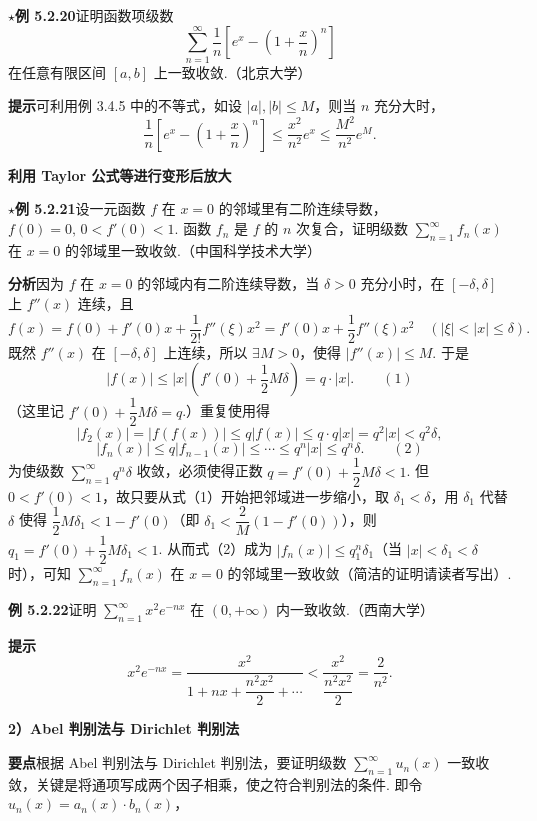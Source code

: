\documentclass[UTF8,12pt,a4paper,fontset=fandol]{ctexart}
\begin{document}
\noindent\textbf{$\star$例 5.2.20}\quad 证明函数项级数
\[
  \sum_{n=1}^{\infty}\frac1n\left[e^x-\left(1+\frac{x}{n}\right)^n\right]
\]
在任意有限区间 $[a,b]$ 上一致收敛.（北京大学）

\noindent\textbf{提示}\quad 可利用例 3.4.5 中的不等式，如设 $|a|,|b|\le M$，则当 $n$ 充分大时，
\[
  \frac1n\left[e^x-\left(1+\frac{x}{n}\right)^n\right]
  \le \frac{x^2}{n^2}e^x\le \frac{M^2}{n^2}e^M.
\]

\noindent\textbf{利用 Taylor 公式等进行变形后放大}

\noindent\textbf{$\star$例 5.2.21}\quad 设一元函数 $f$ 在 $x=0$ 的邻域里有二阶连续导数，
$f(0)=0,\,0<f'(0)<1$. 函数 $f_n$ 是 $f$ 的 $n$ 次复合，证明级数
$\displaystyle\sum_{n=1}^{\infty}f_n(x)$ 在 $x=0$ 的邻域里一致收敛.（中国科学技术大学）

\noindent\textbf{分析}\quad 因为 $f$ 在 $x=0$ 的邻域内有二阶连续导数，当 $\delta>0$ 充分小时，在
$[-\delta,\delta]$ 上 $f''(x)$ 连续，且
\[
  f(x)=f(0)+f'(0)x+\frac1{2!}f''(\xi)x^2
  =f'(0)x+\frac12 f''(\xi)x^2\quad(|\xi|<|x|\le\delta).
\]
既然 $f''(x)$ 在 $[-\delta,\delta]$ 上连续，所以 $\exists M>0$，使得
$|f''(x)|\le M$. 于是
\[
  |f(x)|\le |x|\left(f'(0)+\frac12M\delta\right)=q\cdot |x|.
\qquad(1)
\]
（这里记 $f'(0)+\dfrac12M\delta=q$.）重复使用得
\[
  |f_2(x)|=|f(f(x))|\le q|f(x)|\le q\cdot q|x|=q^2|x|<q^2\delta,
\]
\[
  |f_n(x)|\le q|f_{n-1}(x)|\le\cdots\le q^n|x|\le q^n\delta.
\qquad(2)
\]
为使级数 $\displaystyle\sum_{n=1}^{\infty}q^n\delta$ 收敛，必须使得正数
$q=f'(0)+\dfrac12M\delta<1$. 但 $0<f'(0)<1$，故只要从式（1）开始把邻域进一步缩小，取
$\delta_1<\delta$，用 $\delta_1$ 代替 $\delta$ 使得
$\dfrac12M\delta_1<1-f'(0)$（即
$\delta_1<\dfrac2M(1-f'(0))$），则
$q_1=f'(0)+\dfrac12M\delta_1<1$. 从而式（2）成为
$|f_n(x)|\le q_1^n\delta_1$（当 $|x|<\delta_1<\delta$ 时），可知
$\displaystyle\sum_{n=1}^{\infty}f_n(x)$ 在 $x=0$ 的邻域里一致收敛（简洁的证明请读者写出）.

\noindent\textbf{例 5.2.22}\quad 证明 $\displaystyle\sum_{n=1}^{\infty}x^2e^{-nx}$ 在
$(0,+\infty)$ 内一致收敛.（西南大学）

\noindent\textbf{提示}\quad
\[
  x^2e^{-nx}
  =\frac{x^2}{1+nx+\dfrac{n^2x^2}{2}+\cdots}
  <\frac{x^2}{\dfrac{n^2x^2}{2}}=\frac2{n^2}.
\]

\noindent\textbf{2）Abel 判别法与 Dirichlet 判别法}

\noindent\textbf{要点}\quad 根据 Abel 判别法与 Dirichlet 判别法，要证明级数
$\displaystyle\sum_{n=1}^{\infty}u_n(x)$ 一致收敛，关键是将通项写成两个因子相乘，使之符合判别法的条件. 即令
$u_n(x)=a_n(x)\cdot b_n(x)$，
\end{document}
